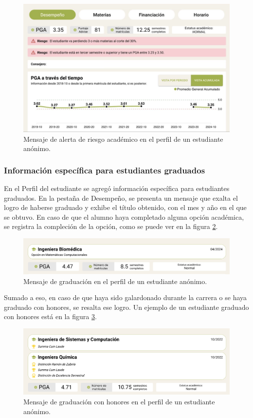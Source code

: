 \begin{figure}[H]
	\centering
	\includegraphics[width=\textwidth]{assets/nes/riesgo_academico.png}
	\caption{Mensaje de alerta de riesgo académico en el perfil de un estudiante anónimo.}
	\label{fig:riesgo_academico}
\end{figure}

\subsubsection{Información específica para estudiantes graduados}

En el Perfil del estudiante se agregó información específica para estudiantes graduados. En la pestaña de Desempeño, se presenta un mensaje que exalta el logro de haberse graduado y exhibe el título obtenido, con el mes y año en el que se obtuvo. En caso de que el alumno haya completado alguna opción académica, se registra la compleción de la opción, como se puede ver en la figura \ref{fig:graduado}.

\begin{figure}[H]
	\centering
	\includegraphics[width=\textwidth]{assets/nes/graduado.png}
	\caption{Mensaje de graduación en el perfil de un estudiante anónimo.}
	\label{fig:graduado}
\end{figure}

Sumado a eso, en caso de que haya sido galardonado durante la carrera o se haya graduado con honores, se resalta ese logro. Un ejemplo de un estudiante graduado con honores está en la figura \ref{fig:graduado_honores}.

\begin{figure}[H]
	\centering
	\includegraphics[width=\textwidth]{assets/nes/graduado_honores.png}
	\caption{Mensaje de graduación con honores en el perfil de un estudiante anónimo.}
	\label{fig:graduado_honores}
\end{figure}
